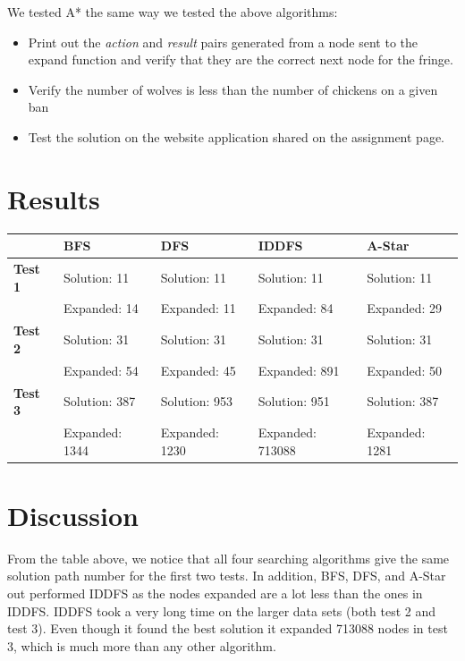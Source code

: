 \documentclass[onecolumn,draftclsnofoot, 10pt, compsoc]{IEEEtran}
\begin{document}
	We tested A* the same way we tested the above algorithms:
	\begin{itemize}
		\item Print out the \textit{action} and \textit{result} pairs generated from a node sent to the expand function and verify that they are the correct next node for the fringe.
		
		\item Verify the number of wolves is less than the number of chickens on a given ban
		
		\item Test the solution on the website application shared on the assignment page.
	\end{itemize}
	
	
	\section{Results}
	\begin{center}
    \begin{tabular}{|l|l|l|l|l|}
        \hline
        & \textbf{BFS} & \textbf{DFS} & \textbf{IDDFS} & \textbf{A-Star} \\ \hline
        \textbf{Test 1} & Solution: 11 & Solution: 11 & Solution: 11 & Solution: 11 \\
        & Expanded: 14 & Expanded: 11 & Expanded: 84 & Expanded: 29 \\ \hline
        \textbf{Test 2} & Solution: 31 & Solution: 31 & Solution: 31 & Solution: 31 \\
        & Expanded: 54 & Expanded: 45 & Expanded: 891 & Expanded: 50 \\ \hline
        \textbf{Test 3} & Solution: 387 & Solution: 953 & Solution: 951 & Solution: 387 \\
        & Expanded: 1344 & Expanded: 1230 & Expanded: 713088 & Expanded: 1281 \\ \hline
    \end{tabular}
\end{center}
	
	
	
	
	
	\section{Discussion}
	From the table above, we notice that all four searching algorithms give the same solution path number for the first two tests. In addition, BFS, DFS, and A-Star out performed IDDFS as the nodes expanded are a lot less than the ones in IDDFS. 
    \indent IDDFS took a very long time on the larger data sets (both test 2 and test 3). Even though it found the best solution it expanded 713088 nodes in test 3, which is much more than any other algorithm.
	
\end{document}
